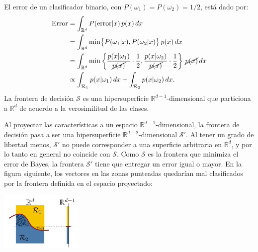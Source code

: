 \documentclass[spanish]{article}
\newcommand{\given}{\vert}
\newcommand{\R}{\mathbb{R}}
\begin{document}
    El error de un clasificador binario, con $P(\omega_1) = P(\omega_2) = 1/2$, está dado por:
    \begin{align}
        \text{Error}
        &= \int_{\R^d} P(\text{error}\given x)\, p(x)\, dx \\
        &= \int_{\R^d} \min\bigl\{
                P(\omega_1\given x), P(\omega_2\given x)
           \bigr\}\, p(x)\, dx \\
        &= \int_{\R^d} \min\left\{
                \frac{p(x\given\omega_1)}{\cancel{p(x)}}\cdot
                \frac{1}{2},
                \frac{p(x\given\omega_2)}{\cancel{p(x)}}\cdot
                \frac{1}{2}
           \right\}\, \cancel{p(x)}\, dx \\
        &\propto 
           \int_{\mathcal{R}_1} p(x\given\omega_1)\, dx +
           \int_{\mathcal{R}_2} p(x\given\omega_2)\, dx.
    \end{align}
    La frontera de decisión $\mathcal{S}$ es una hipersuperficie $\R^{d-1}$-dimensional que
    particiona a $\R^d$ de acuerdo a la verosimilitud de las clases.

    Al proyectar las características a un espacio $\R^{d-1}$-dimensional, la frontera de decisión
    pasa a ser una hipersuperficie $\R^{d-2}$-dimensional $\mathcal{S}'$.
    Al tener un grado de libertad menos, $\mathcal{S}'$ no puede corresponder a una superficie
    arbitraria en $\R^d$, y por lo tanto en general no coincide con $\mathcal{S}$.  Como
    $\mathcal{S}$ es la frontera que minimiza el error de Bayes, la frontera $\mathcal{S}'$ tiene
    que entregar un error igual o mayor.  En la figura siguiente, los vectores en las zonas
    punteadas quedarían mal clasificados por la frontera definida en el espacio proyectado:
    \begin{center}
        \includegraphics[width=0.3\textwidth]{error.png}
    \end{center}
\end{document}
